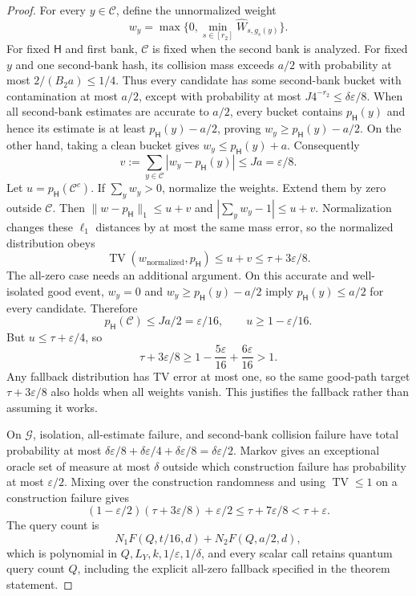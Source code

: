 \documentclass[11pt]{article}
\theoremstyle{definition}\newtheorem{definition}[theorem]{Definition}
\theoremstyle{remark}\newtheorem{remark}[theorem]{Remark}
\newcommand{\mc}{\mathcal}\newcommand{\eps}{\varepsilon}
\DeclareMathOperator{\TV}{TV}\DeclareMathOperator{\FC}{FC}
\begin{document}
\begin{proof}
For every \(y\in\mc C\), define the unnormalized weight
\[
 w_y=\max\{0,\min_{s\in[r_2]}\widehat W_{s,g_s(y)}\}.
\]
For fixed \(\mathsf H\) and first bank, \(\mc C\) is fixed when the second bank is analyzed. For fixed \(y\) and one second-bank hash, its collision mass exceeds \(a/2\) with probability at most \(2/(B_2a)\le1/4\). Thus every candidate has some second-bank bucket with contamination at most \(a/2\), except with probability at most \(J4^{-r_2}\le\delta\eps/8\). When all second-bank estimates are accurate to \(a/2\), every bucket contains \(p_{\mathsf H}(y)\) and hence its estimate is at least \(p_{\mathsf H}(y)-a/2\), proving \(w_y\ge p_{\mathsf H}(y)-a/2\). On the other hand, taking a clean bucket gives \(w_y\le p_{\mathsf H}(y)+a\). Consequently
\[
 v:=\sum_{y\in\mc C}|w_y-p_{\mathsf H}(y)|\le Ja=\eps/8.
\]
Let \(u=p_{\mathsf H}(\mc C^c)\). If \(\sum_yw_y>0\), normalize the weights. Extend them by zero outside \(\mc C\). Then \(\|w-p_{\mathsf H}\|_1\le u+v\) and \(|\sum_yw_y-1|\le u+v\). Normalization changes these \(\ell_1\) distances by at most the same mass error, so the normalized distribution obeys
\[
 \TV(w_{\mathrm{normalized}},p_{\mathsf H})\le u+v\le\tau+3\eps/8.
\]
The all-zero case needs an additional argument. On this accurate and well-isolated good event, \(w_y=0\) and \(w_y\ge p_{\mathsf H}(y)-a/2\) imply \(p_{\mathsf H}(y)\le a/2\) for every candidate. Therefore
\[
 p_{\mathsf H}(\mc C)\le Ja/2=\eps/16,\qquad u\ge1-\eps/16.
\]
But \(u\le\tau+\eps/4\), so
\[
 \tau+3\eps/8\ge1-\frac{5\eps}{16}+\frac{6\eps}{16}>1.
\]
Any fallback distribution has TV error at most one, so the same good-path target \(\tau+3\eps/8\) also holds when all weights vanish. This justifies the fallback rather than assuming it works.

On \(\mc G\), isolation, all-estimate failure, and second-bank collision failure have total probability at most \(\delta\eps/8+\delta\eps/4+\delta\eps/8=\delta\eps/2\). Markov gives an exceptional oracle set of measure at most \(\delta\) outside which construction failure has probability at most \(\eps/2\). Mixing over the construction randomness and using \(\TV\le1\) on a construction failure gives
\[
 (1-\eps/2)(\tau+3\eps/8)+\eps/2\le\tau+7\eps/8<\tau+\eps.
\]
The query count is
\[
 N_1F(Q,t/16,d)+N_2F(Q,a/2,d),
\]
which is polynomial in \(Q,L_Y,k,1/\eps,1/\delta\), and every scalar call retains quantum query count \(Q\), including the explicit all-zero fallback specified in the theorem statement.
\end{proof}
\end{document}
